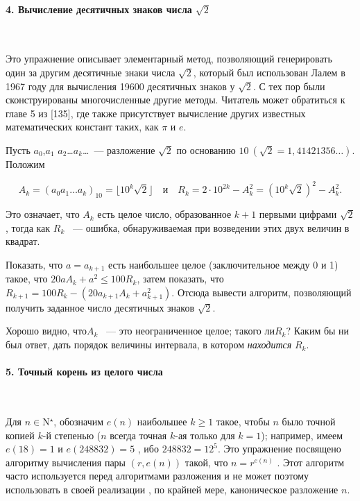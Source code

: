 \paragraph { 4. Вычисление десятичных знаков числа $\sqrt{2}$}\ \newline

Это упражнение описывает элементарный метод, позволяющий генерировать один за другим десятичные знаки числа $\sqrt{2}$, который был использован Лалем в 1967 году для вычисления 19600 десятичных знаков у $\sqrt{2}$. С тех пор были сконструированы многочисленные другие методы. Читатель может обратиться к главе 5 из [135], где также присутствует вычисление других известных математических констант таких, как ${\pi}$ и ${e}$.

Пусть $ a_{0}$,$a_{1}$ $a_{2}$\dots $a_{k}$\dots ~--- разложение $\sqrt{2}$ по основанию $10~(\sqrt{2}=1,41421356 \dots)$. Положим 

\begin{equation*}
A_{k}=\left(a_{0}a_{1}\ldots a_{k}\right)_{10}=\lfloor{10^{k}\sqrt{2}}\rfloor \quad\text{и}\quad R_{k}=2\cdot10^{2k}-A_k^2=\left({10^{k}\sqrt{2}}\right)^{2}-A_k^2.
\end{equation*}

\newpage
	

\noindent Это означает, что $A_{k}$ есть целое число, образованное $k+1$ первыми цифрами $\sqrt{2}$, тогда как $R_{k}$ ~--- ошибка, обнаруживаемая при возведении этих двух величин в квадрат.

Показать, что $a=a_{k+1}$ есть наибольшее целое (заключительное между 0 и 1) такое, что $20aA_{k}+a^{2}\leq{100R_{k}}$, затем показать, что $R_{k+1}=100R_{k} - \left({20a_{k+1}A_{k}+ a_{k+1}^2}\right)$. Отсюда вывести алгоритм, позволяющий получить заданное число десятичных знаков $\sqrt{2}$. 

Хорошо видно, что$ A_{k}$ ~--- это неограниченное целое; такого ли$ R_{k}$?
Каким бы ни был ответ, дать порядок величины интервала, в котором \textit{находится} $R_{k}$.

\paragraph{5. Точный корень из целого числа}\ \newline

Для $n \in $N${^\star}$, обозначим $e\left({n}\right)$  наибольшее $k\geq{1}$ такое, чтобы $n$ было точной копией $k$-й степенью ($n$  всегда точная $k$-ая только для $k=1$); например, имеем $e\left({18}\right)=1$ и $e\left({248832}\right)=5$ , ибо $248832=12^{5}$. Это упражнение посвящено алгоритму вычисления пары $\left({r,e\left({n}\right)}\right)$  такой, что $n=r^{e\left({n}\right)}$ . Этот алгоритм часто используется перед алгоритмами разложения и не может поэтому использовать в своей реализации , по крайней мере,  каноническое разложение $n$.

